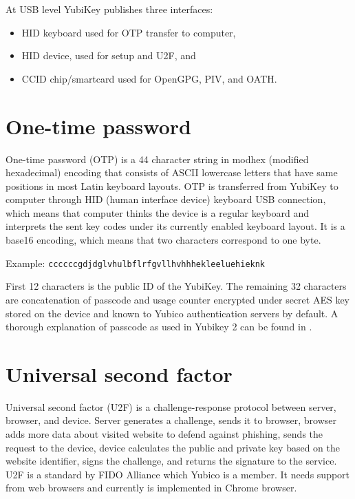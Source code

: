 \documentclass[a4paper]{article}
\begin{document}
At USB level YubiKey publishes three interfaces:

\begin{itemize}
	\item HID keyboard used for OTP transfer to computer,
	\item HID device, used for setup and U2F, and
	\item CCID chip/smartcard used for OpenGPG, PIV, and OATH.
\end{itemize}


\section{One-time password}

One-time password (OTP) is a 44 character string in modhex (modified hexadecimal) encoding that consists of ASCII lowercase letters that have same positions in most Latin keyboard layouts. OTP is transferred from YubiKey to computer through HID (human interface device) keyboard USB connection, which means that computer thinks the device is a regular keyboard and interprets the sent key codes under its currently enabled keyboard layout. It is a base16 encoding, which means that two characters correspond to one byte.

Example: \texttt{ccccccgdjdglvhulbflrfgvllhvhhhekleeluehieknk}

First 12 characters is the public ID of the YubiKey. The remaining 32 characters are concatenation of passcode and usage counter encrypted under secret AES key stored on the device and known to Yubico authentication servers by default. A thorough explanation of passcode as used in Yubikey 2 can be found in \citet{oswald2013side}.


\section{Universal second factor}

Universal second factor (U2F) is a challenge-response protocol between server, browser, and device. Server generates a challenge, sends it to browser, browser adds more data about visited website to defend against phishing, sends the request to the device, device calculates the public and private key based on the website identifier, signs the challenge, and returns the signature to the service. U2F is a standard by FIDO Alliance which Yubico is a member. It needs support from web browsers and currently is implemented in Chrome browser.
\end{document}
